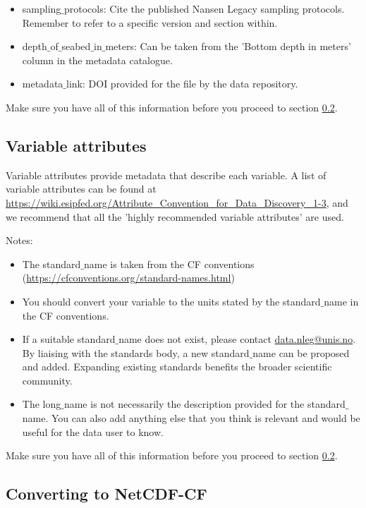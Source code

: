 \documentclass[a4paper,english, 11pt]{article}
\makeatletter
\newcommand{\emailme}{\href{mailto:data.nleg@unis.no}{data.nleg@unis.no}}
\makeatother
\begin{document}
\begin{itemize}
\item sampling$\_$protocols: Cite the published Nansen Legacy sampling protocols. Remember to refer to a specific version and section within.
\item depth$\_$of$\_$seabed$\_$in$\_$meters: Can be taken from the 'Bottom depth in meters' column in the metadata catalogue.
\item metadata$\_$link: DOI provided for the file by the data repository.
\end{itemize}   

Make sure you have all of this information before you proceed to section \ref{ss:convertingnetcdf}.

\subsection{Variable attributes}
\label{ss:variableattributes}

Variable attributes provide metadata that describe each variable. A list of variable attributes can be found at \url{https://wiki.esipfed.org/Attribute_Convention_for_Data_Discovery_1-3}, and we recommend that all the 'highly recommended variable attributes' are used.

Notes:
\begin{itemize}
\item The standard$\_$name is taken from the CF conventions (\url{https://cfconventions.org/standard-names.html})
\item You should convert your variable to the units stated by the standard$\_$name in the CF conventions.
\item If a suitable standard$\_$name does not exist, please contact \emailme . By liaising with the standards body, a new standard$\_$name can be proposed and added. Expanding existing standards benefits the broader scientific community.
\item The long$\_$name is not necessarily the description provided for the standard$\_$name. You can also add anything else that you think is relevant and would be useful for the data user to know.  
\end{itemize}

Make sure you have all of this information before you proceed to section \ref{ss:convertingnetcdf}.

\subsection{Converting to NetCDF-CF}
\label{ss:convertingnetcdf}
\end{document}
